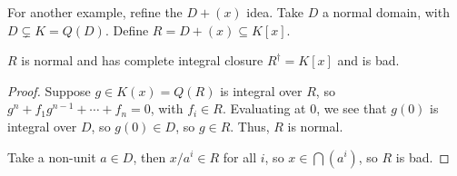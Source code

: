  For another example, refine the $D+(x)$ idea. Take $D$ a normal domain, with
 $D\subsetneq K=Q(D)$. Define $R= D+(x)\subseteq K[x]$.
 \begin{proposition}
   $R$ is normal and has complete integral closure $R^\dag = K[x]$ and is bad.
 \end{proposition}
 \begin{proof}
   Suppose $g\in K(x)=Q(R)$ is integral over $R$, so $g^n+f_1g^{n-1}+\cdots + f_n=0$,
   with $f_i\in R$. Evaluating at 0, we see that $g(0)$ is integral over $D$, so $g(0)\in
   D$, so $g\in R$. Thus, $R$ is normal.

   Take a non-unit $a\in D$, then $x/a^i\in R$ for all $i$, so $x\in \bigcap (a^i)$, so
   $R$ is bad.
 \end{proof}
 \setcounter{lecture}{29}

